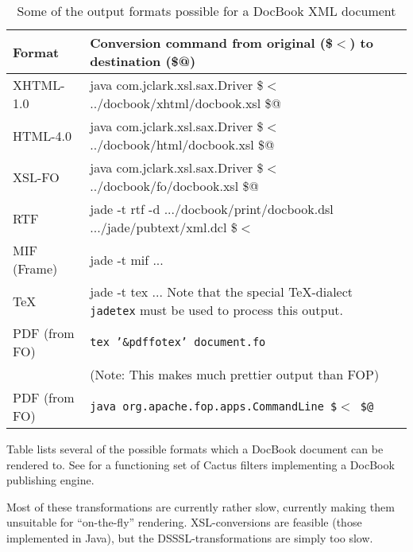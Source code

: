 \begin{table}[htbp]
  \begin{center}
    \begin{tabular}[tb]{|l|p{12cm}|}
\hline\hline
Format & Conversion command from original (\$\(<\)) to destination (\$@)\\
\hline
  XHTML-1.0 & java com.jclark.xsl.sax.Driver \$\(<\) ../docbook/xhtml/docbook.xsl \$@\\
  HTML-4.0 & java com.jclark.xsl.sax.Driver \$\(<\)
  ../docbook/html/docbook.xsl \$@ \\

  XSL-FO & java com.jclark.xsl.sax.Driver \$\(<\) ../docbook/fo/docbook.xsl \$@ \\
  RTF & jade -t rtf -d .../docbook/print/docbook.dsl .../jade/pubtext/xml.dcl \$\(<\)\\
  MIF (Frame) & jade -t mif ... \\
  {\TeX} & jade -t tex ... Note
  that the special {\TeX}-dialect \texttt{jadetex} must be used to
  process this output.\\
  
  PDF (from FO) & \texttt{tex '\&pdffotex' document.fo}  \\
  & (Note:  This
  makes much prettier output than FOP)\\
  
  PDF (from FO) & \texttt{java org.apache.fop.apps.CommandLine \$\(<\)
  \$@}   \\
  
\hline
    \end{tabular}
    \caption{Some of the output formats possible for a DocBook XML document}
    \label{tab:output-formats-possible-for-a-docbook-xml-document}
  \end{center}
\end{table}

Table 
lists several of the possible formats which a DocBook document can be
rendered to.  See  for a functioning set of
Cactus filters implementing a DocBook publishing engine.

Most of these transformations are currently rather slow, currently
making them unsuitable for ``on-the-fly'' rendering.  XSL-conversions
are feasible (those implemented in Java), but the
DSSSL-transformations are simply too slow.





